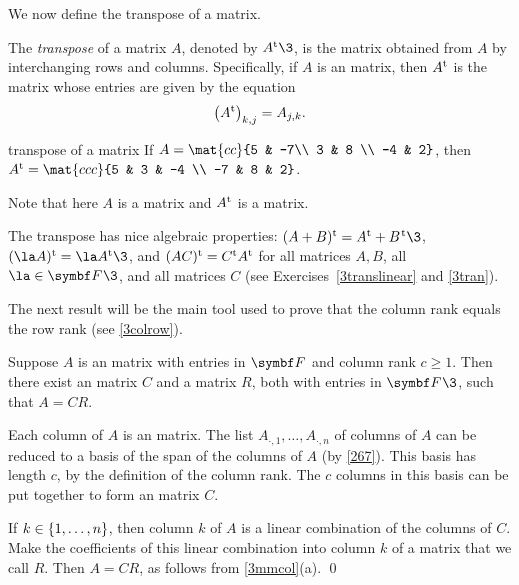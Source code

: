 We now define the transpose of a matrix.

{The \emph{transpose} of a matrix $A$, denoted by $\tran{A}\3$, is the matrix obtained from $A$ by interchanging rows and columns. Specifically, if $A$ is an  matrix, then $\tran{A}$ is the  matrix whose entries are given by the equation
\[
\paren[\big]{\tran{A}}_{k,j} = A_{j, k}.
\]
}

\pagebreak[3]

\begin{example}{transpose of a matrix}
\vspace{-0.06in} %
If $A = \mat{cc}{5 & -7\\ 3 & 8 \\ -4 & 2}$, then
$\tran{A} = \mat{ccc}{5 & 3 & -4 \\ -7 & 8 & 2}$.

Note that here $A$ is a  matrix and $\tran{A}$ is a  matrix.
\end{example}

The transpose has nice algebraic properties: $\tran{(A+B)} = \tran{A} + \tran{B\hspace{.08em}}\3$, $\tran{(\la A)} = \la \tran{A}\3$, and
$\tran{(AC)} = \tran{C} \tran{A}$ for all  matrices $A, B$, all $\la \in \F{}\3$, and all  matrices $C$ (see Exercises~\ref{3translinear} and \ref{3tran}).

The next result will be the main tool used to prove that the column rank equals the row rank (see \ref{3colrow}).

{Suppose $A$ is an  matrix with entries in $\F{}$ and column rank $c \ge 1$.
Then there exist an  matrix $C$ and a  matrix $R$, both with entries in $\F{}\3$, such that
$A = CR$.}

\proof
Each column of $A$ is an  matrix. The list $A_{\cdot, 1}, \ldots, A_{\cdot, n}$ of columns of $A$ can be reduced to a basis of the span of the columns of $A$ (by \ref{267}). This basis has length $c$, by the definition of the column rank. The $c$ columns in this basis can be put together to form an  matrix $C$.

If $k \in \br{1, \ldots, n}$, then column $k$ of $A$ is a linear combination of the columns of $C$. Make the coefficients of this linear combination into column $k$ of a  matrix that we call $R$. Then $A = CR$, as follows from \ref{3mmcol}(a).
\qed

